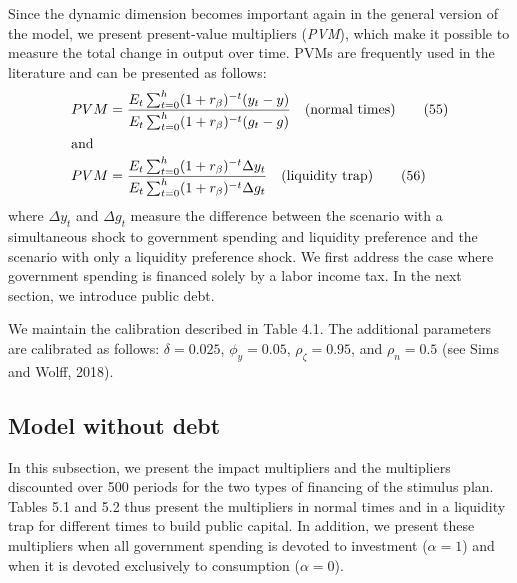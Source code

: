 \documentclass[12pt,letterpaper]{article}
\newcommand{\Et}{E_t}
\newcommand{\T}{\mathbb{T}}
\begin{document}
Since the dynamic dimension becomes important again in the general version of the model, we present present-value multipliers (\emph{PVM}), which make it possible to measure the total change in output over time. PVMs are frequently used in the literature and can be presented as follows:
\begin{align}
PVM &= \frac{\Et\sum_{t=0}^{h}(1+r_\beta)^{-t}(y_t - y)}{\Et\sum_{t=0}^{h}(1+r_\beta)^{-t}(g_t - g)} \quad \text{(normal times)} \tag{55}\\
\intertext{and}
PVM &= \frac{\Et\sum_{t=0}^{h}(1+r_\beta)^{-t}\Delta y_t}{\Et\sum_{t=0}^{h}(1+r_\beta)^{-t}\Delta g_t} \quad \text{(liquidity trap)} \tag{56}
\end{align}
where $\Delta y_t$ and $\Delta g_t$ measure the difference between the scenario with a simultaneous shock to government spending and liquidity preference and the scenario with only a liquidity preference shock. We first address the case where government spending is financed solely by a labor income tax. In the next section, we introduce public debt.

We maintain the calibration described in Table 4.1. The additional parameters are calibrated as follows: $\delta = 0.025$, $\phi_y = 0.05$, $\rho_\zeta = 0.95$, and $\rho_n = 0.5$ (see Sims and Wolff, 2018).

\subsection{Model without debt}

In this subsection, we present the impact multipliers and the multipliers discounted over 500 periods for the two types of financing of the stimulus plan. Tables 5.1 and 5.2 thus present the multipliers in normal times and in a liquidity trap for different times to build public capital. In addition, we present these multipliers when all government spending is devoted to investment ($\alpha = 1$) and when it is devoted exclusively to consumption ($\alpha = 0$).

\newcommand{\multtable}[9]{%
\begin{tabular}{llccc}
\toprule
& & $\alpha = 0$ & \multicolumn{2}{c}{$\alpha = 1$}\\
& & & $\T = 1$ & $\T = 16$\\
\midrule
\multirow{2}{*}{\textbf{Impact}} & Normal times & #1 & #2 & #3\\
 & Liquidity trap & #4 & #5 & #6\\
\multirow{2}{*}{\textbf{\emph{PVM} over 500 periods}} & Normal times & #7 & #8 & #9\\
}
\end{document}
